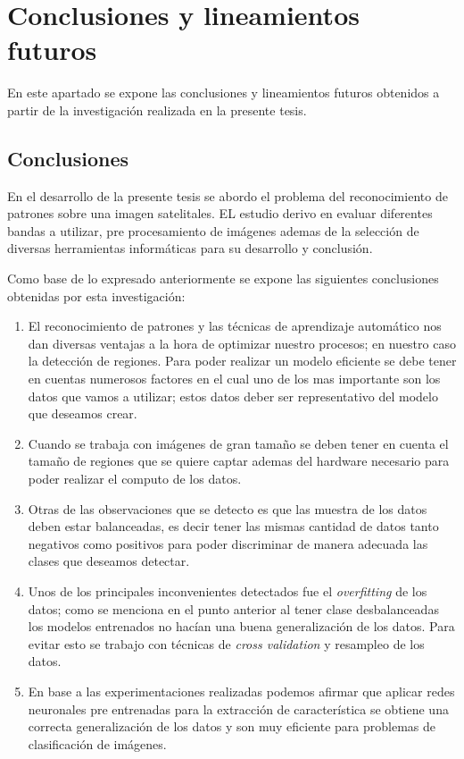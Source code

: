 \chapter{Conclusiones y lineamientos futuros}\label{chap:conclusiones}
En este apartado se expone las conclusiones y lineamientos futuros obtenidos a partir de la investigación realizada en la presente tesis. 

\section{Conclusiones}
En el desarrollo de la presente tesis se abordo el problema del reconocimiento de patrones sobre una imagen satelitales. EL estudio derivo en evaluar diferentes bandas a utilizar, pre procesamiento de imágenes ademas de la selección de diversas herramientas informáticas para su desarrollo y conclusión.

Como base de lo expresado anteriormente se expone las siguientes conclusiones obtenidas por esta investigación:
\begin{enumerate}
\item El reconocimiento de patrones y las técnicas de aprendizaje automático nos dan diversas ventajas a la hora de optimizar nuestro procesos; en nuestro caso la detección de regiones. Para poder realizar un modelo eficiente se debe tener en cuentas numerosos factores en el cual uno de los mas importante son los datos que vamos a utilizar; estos datos deber ser representativo del modelo que deseamos crear.

\item Cuando se trabaja con imágenes de gran tamaño se deben tener en cuenta el tamaño de regiones que se quiere captar ademas del hardware necesario para poder realizar el computo de los datos.

\item Otras de las observaciones que se detecto es que las muestra de los datos deben estar balanceadas, es decir tener las mismas cantidad de datos tanto negativos como positivos para poder discriminar de manera adecuada las clases que deseamos detectar.

\item Unos de los principales inconvenientes detectados fue el \textit{overfitting} de los datos; como se menciona en el punto anterior al tener clase desbalanceadas los modelos entrenados no hacían una buena generalización de los datos. Para evitar esto se trabajo con técnicas de \textit{cross validation} y resampleo de los datos.

\item En base a las experimentaciones realizadas podemos afirmar que aplicar redes neuronales pre entrenadas para la extracción de característica se obtiene una correcta generalización de los datos y son muy eficiente para problemas de clasificación de imágenes.

\end{enumerate}

